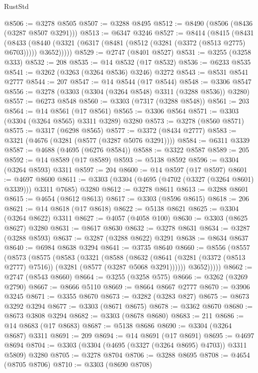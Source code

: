 \begin{lexlean}{RustStd}
\begin{coremodule}
@8506 := @3278 @8505
@8507 := @3288 @8495
@8512 := @8490 (@8506 (@8436 (@3287 @8507 @3291)))
@8513 := @6347 @3246
@8527 := @8414
    (@8415
      (@8431
        (@8433 (@8440 (@3321 (@6317 (@8481 (@8512 (@3281 (@3372 (@8513 @2775) @6703))))) @3652)))))
@8529 := @2747 (@8401 @8527)
@8531 := @3255 (@3258 @333)
@8532 := 208
@8535 := @14 @8532 (@17 @8532)
@8536 := @6233 @8535
@8541 := @3262 (@3263 (@3264 @8536) @3246) @3272
@8543 := @8531 @8541 @2777
@8544 := 207
@8547 := @14 @8544 (@17 @8544)
@8548 := @3306 @8547
@8556 := @3278 (@3303 (@3304 (@3264 @8548) @3311 (@3288 @8536)) @3280)
@8557 := @6273 @8548
@8560 := @3303 (@7317 (@3288 @8548))
@8561 := 203
@8564 := @14 @8561 (@17 @8561)
@8565 := @3306 @8564
@8571 := @3303 (@3304 (@3264 @8565) @3311 @3289) @3280
@8573 := @3278 (@8560 @8571)
@8575 := @3317 (@6298 @8565)
@8577 := @3372 (@8434 @2777)
@8583 := @3321 (@4676 (@3281 (@8577 (@3287 @5076 @3291))))
@8584 := @6311 @3339
@8587 := @4688 (@4695 (@6276 @8584))
@8588 := @3322 @8587
@8589 := 205
@8592 := @14 @8589 (@17 @8589)
@8593 := @5138 @8592
@8596 := @3304 (@3264 @8593) @3311
@8597 := 204
@8600 := @14 @8597 (@17 @8597)
@8601 := @4697 @8600
@8611 := @3303 (@3304 (@4695 (@4702 (@3327 (@3264 @8601) @3339))) @3311 @7685) @3280
@8612 := @3278 @8611
@8613 := @3288 @8601
@8615 := @4654 (@8612 @8613)
@8617 := @3303 (@8596 @8615)
@8618 := 206
@8621 := @14 @8618 (@17 @8618)
@8622 := @5138 @8621
@8625 := @3304 (@3264 @8622) @3311
@8627 := @4057 (@4058 @100)
@8630 := @3303 (@8625 @8627) @3280
@8631 := @8617 @8630
@8632 := @3278 @8631
@8634 := @3287 (@3288 @8593)
@8637 := @3287 (@3288 @8622) @3291
@8638 := @8634 @8637
@8640 := @6984 @8638 @3294
@8641 := @3735 @8640
@8660 := @8556
    (@8557
      (@8573
        (@8575
          (@8583
            (@3321
              (@8588
                (@8632
                  (@8641 (@3281 (@3372 (@8513 @2777) @7516)) (@3281 (@8577 (@3287 @5068 @3291))))))
              @3652)))))
@8662 := @2747 (@8543 @8660)
@8664 := @3255 (@3258 @575)
@8666 := @3262 (@3269 @2790)
@8667 := @8666 @5110
@8669 := @8664 @8667 @2777
@8670 := @3906 @3245
@8671 := @3355 @8670
@8673 := @3282 (@3283 @827)
@8675 := @8673 @3292 @3294
@8677 := @3303 (@8671 @8675)
@8678 := @3362 @8670
@8680 := @8673 @3808 @3294
@8682 := @3303 (@8678 @8680)
@8683 := 211
@8686 := @14 @8683 (@17 @8683)
@8687 := @5138 @8686
@8690 := @3304 (@3264 @8687) @3311
@8691 := 209
@8694 := @14 @8691 (@17 @8691)
@8695 := @4697 @8694
@8704 := @3303 (@3304 (@4695 (@3327 (@3264 @8695) @4703)) @3311 @5809) @3280
@8705 := @3278 @8704
@8706 := @3288 @8695
@8708 := @4654 (@8705 @8706)
@8710 := @3303 (@8690 @8708)

\end{coremodule}
\end{lexlean}
